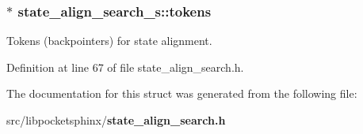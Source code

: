 \subsubsection[{tokens}]{$\ast$ {\bf state\-\_\-align\-\_\-search\-\_\-s\-::tokens}}\label{structstate__align__search__s_ab4b6f67b07b2e9d48a0af31474c5e29b}


\-Tokens (backpointers) for state alignment. 



\-Definition at line 67 of file state\-\_\-align\-\_\-search.\-h.



\-The documentation for this struct was generated from the following file\-:\begin{DoxyCompactItemize}
\item 
src/libpocketsphinx/{\bf state\-\_\-align\-\_\-search.\-h}\end{DoxyCompactItemize}
